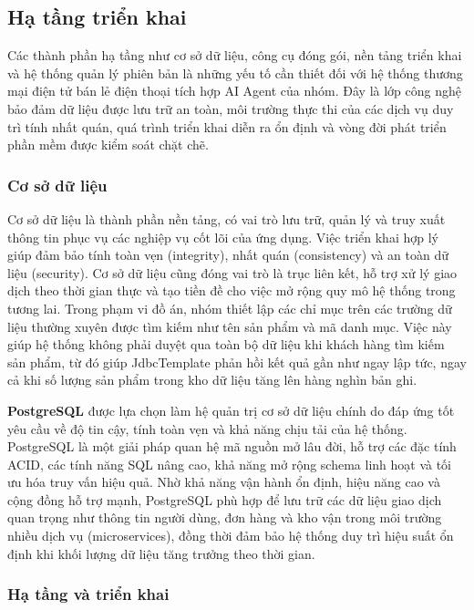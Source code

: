 \subsection{Hạ tầng triển khai}

Các thành phần hạ tầng như cơ sở dữ liệu, công cụ đóng gói, nền tảng triển khai và hệ thống quản lý phiên bản là những yếu tố cần thiết đối với hệ thống thương mại điện tử bán lẻ điện thoại tích hợp AI Agent của nhóm. Đây là lớp công nghệ bảo đảm dữ liệu được lưu trữ an toàn, môi trường thực thi của các dịch vụ duy trì tính nhất quán, quá trình triển khai diễn ra ổn định và vòng đời phát triển phần mềm được kiểm soát chặt chẽ. 

\subsubsection{Cơ sở dữ liệu}

Cơ sở dữ liệu là thành phần nền tảng, có vai trò lưu trữ, quản lý và truy xuất thông tin phục vụ các nghiệp vụ cốt lõi của ứng dụng. Việc triển khai hợp lý giúp đảm bảo tính toàn vẹn (integrity), nhất quán (consistency) và an toàn dữ liệu (security). Cơ sở dữ liệu cũng đóng vai trò là trục liên kết, hỗ trợ xử lý giao dịch theo thời gian thực và tạo tiền đề cho việc mở rộng quy mô hệ thống trong tương lai. Trong phạm vi đồ án, nhóm thiết lập các chỉ mục trên các trường dữ liệu thường xuyên được tìm kiếm như tên sản phẩm và mã danh mục. Việc này giúp hệ thống không phải duyệt qua toàn bộ dữ liệu khi khách hàng tìm kiếm sản phẩm, từ đó giúp JdbcTemplate phản hồi kết quả gần như ngay lập tức, ngay cả khi số lượng sản phẩm trong kho dữ liệu tăng lên hàng nghìn bản ghi.

\textbf{PostgreSQL} được lựa chọn làm hệ quản trị cơ sở dữ liệu chính do đáp ứng tốt yêu cầu về độ tin cậy, tính toàn vẹn và khả năng chịu tải của hệ thống. PostgreSQL là một giải pháp quan hệ mã nguồn mở lâu đời, hỗ trợ các đặc tính ACID, các tính năng SQL nâng cao, khả năng mở rộng schema linh hoạt và tối ưu hóa truy vấn hiệu quả. Nhờ khả năng vận hành ổn định, hiệu năng cao và cộng đồng hỗ trợ mạnh, PostgreSQL phù hợp để lưu trữ các dữ liệu giao dịch quan trọng như thông tin người dùng, đơn hàng và kho vận trong môi trường nhiều dịch vụ (microservices), đồng thời đảm bảo hệ thống duy trì hiệu suất ổn định khi khối lượng dữ liệu tăng trưởng theo thời gian.

\subsubsection{Hạ tầng và triển khai}

